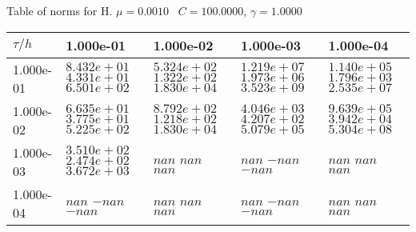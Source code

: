 \begin{center}
Table of norms for H. $\mu = 0.0010$ \, $C = 100.0000$, $\gamma = 1.0000$
  
\begin{tabular}{|p{1in}|p{1in}|p{1in}|p{1in}|p{1in}|} \hline
$\tau / h$ &1.000e-01 &1.000e-02 &1.000e-03 &1.000e-04 \\ \hline 
1.000e-01 & $8.432e+01$  $4.331e+01$  $6.501e+02$  & $5.324e+02$  $1.322e+02$  $1.830e+04$  & $1.219e+07$  $1.973e+06$  $3.523e+09$  & $1.140e+05$  $1.796e+03$  $2.535e+07$  \\ \hline 
1.000e-02 & $6.635e+01$  $3.775e+01$  $5.225e+02$  & $8.792e+02$  $1.218e+02$  $1.830e+04$  & $4.046e+03$  $4.207e+02$  $5.079e+05$  & $9.639e+05$  $3.942e+04$  $5.304e+08$  \\ \hline 
1.000e-03 & $3.510e+02$  $2.474e+02$  $3.672e+03$  & $nan$  $nan$  $nan$  & $nan$  $-nan$  $-nan$  & $nan$  $nan$  $nan$  \\ \hline 
1.000e-04 & $nan$  $-nan$  $-nan$  & $nan$  $nan$  $nan$  & $nan$  $-nan$  $-nan$  & $nan$  $nan$  $nan$  \\ \hline 

\end{tabular}\\[20pt]
\end{center}
